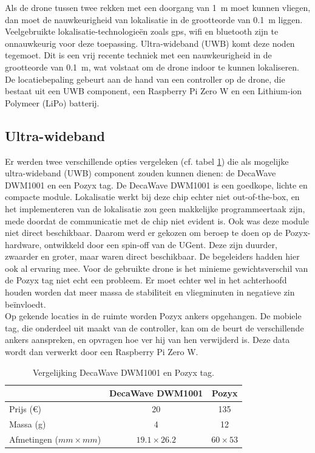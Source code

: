 Als de drone tussen twee rekken met een doorgang van \SI{1}{\m} moet kunnen vliegen, dan moet de nauwkeurigheid van lokalisatie in de grootteorde van \SI{0.1}{\m} liggen.
Veelgebruikte lokalisatie-technologieën zoals gps, wifi en bluetooth zijn te onnauwkeurig voor deze toepassing.
Ultra-wideband (UWB) komt deze noden tegemoet.
Dit is een vrij recente techniek met een nauwkeurigheid in de grootteorde van \SI{0.1}{\m}, wat volstaat om de drone indoor te kunnen lokaliseren.
De locatiebepaling gebeurt aan de hand van een controller op de drone, die bestaat uit een UWB component, een Raspberry Pi Zero W en een Lithium-ion Polymeer (LiPo) batterij.\\

\subsection{Ultra-wideband} \label{sec:uwb}
Er werden twee verschillende opties vergeleken (cf. tabel \ref{tab:decavspozyx}) die als mogelijke ultra-wideband (UWB) component zouden kunnen dienen: de DecaWave DWM1001 en een Pozyx tag.
De DecaWave DWM1001 is een goedkope, lichte en compacte module. Lokalisatie werkt bij deze chip echter niet out-of-the-box, en het implementeren van de lokalisatie zou geen makkelijke programmeertaak zijn, mede doordat de communicatie met de chip niet evident is.
Ook was deze module niet direct beschikbaar.
Daarom werd er gekozen om beroep te doen op de Pozyx-hardware, ontwikkeld door een spin-off van de UGent.
Deze zijn duurder, zwaarder en groter, maar waren direct beschikbaar.
De begeleiders hadden hier ook al ervaring mee.
Voor de gebruikte drone is het minieme gewichtsverschil van de Pozyx tag niet echt een probleem.
Er moet echter wel in het achterhoofd houden worden dat meer massa de stabiliteit en vliegminuten in negatieve zin beïnvloedt.\\

Op gekende locaties in de ruimte worden Pozyx ankers opgehangen.
De mobiele tag, die onderdeel uit maakt van de controller, kan om de beurt de verschillende ankers aanspreken, en opvragen hoe ver hij van hen verwijderd is.
Deze data wordt dan verwerkt door een Raspberry Pi Zero W.
\begin{table}[p]
	\centering
	\begin{tabular}{ | l | c | c | } \hline
		& DecaWave DWM1001 & Pozyx \\
		\hline 
		\hline
		Prijs (\euro{}) & 20 & 135 \\ 
		\hline
		Massa (g) & 4 & 12 \\ 
		\hline
		Afmetingen ($mm \times mm$) & $19.1 \times 26.2$ & $60 \times 53$ \\ 
		\hline
	\end{tabular}
	\caption[Vergelijking DecaWave DWM1001 en Pozyx tag]{Vergelijking DecaWave DWM1001 en Pozyx tag.}
	\label{tab:decavspozyx}
\end{table}

